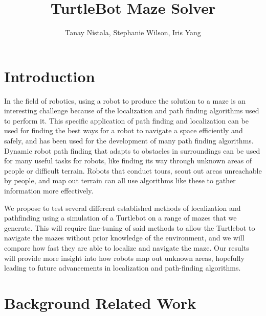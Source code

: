 \documentclass{article}
\title{TurtleBot Maze Solver}
\author{Tanay Nistala, Stephanie Wilson, Iris Yang}
\date{\vspace{-1em}}
\begin{document}
\maketitle


\section{Introduction}


In the field of robotics, using a robot to produce the solution to a maze is an interesting challenge because of the localization and path finding algorithms used to perform it. This specific application of path finding and localization can be used for finding the best ways for a robot to navigate a space efficiently and safely, and has been used for the development of many path finding algorithms. Dynamic robot path finding that adapts to obstacles in surroundings can be used for many useful tasks for robots, like finding its way through unknown areas of people or difficult terrain. Robots that conduct tours, scout out areas unreachable by people, and map out terrain can all use algorithms like these to gather information more effectively. 

We propose to test several different established methods of localization and pathfinding using a simulation of a Turtlebot on a range of mazes that we generate. This will require fine-tuning of said methods to allow the Turtlebot to navigate the mazes without prior knowledge of the environment, and we will compare how fast they are able to localize and navigate the maze. Our results will provide more insight into how robots map out unknown areas, hopefully leading to future advancements in localization and path-finding algorithms. 

\section{Background Related Work}
\end{document}
